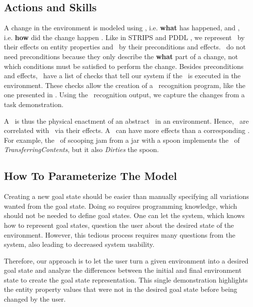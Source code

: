 \subsection{Actions and Skills}\label{ssec:actions_skills}
A change in the environment is modeled using \actions, i.e. \textbf{what} has happened, and \skills, i.e. \textbf{how} did the change happen \cite{conceptHierarchyGeriatronicsSummit24}. Like in STRIPS \cite{strips} and PDDL \cite{pddl}, we represent \actions\ by their effects on entity properties and \skills\ by their preconditions and effects. \actions\ do not need preconditions because they only describe the \textbf{what} part of a change, not which conditions must be satisfied to perform the change. Besides preconditions and effects, \skills\ have a list of checks that tell our system if the \skill\ is executed in the environment. These checks allow the creation of a \skill\ recognition program, like the one presented in \cite{conceptHierarchyGeriatronicsSummit24}.
Using the \skill\ recognition output, we capture the changes from a task demonstration.

A \skill\ is thus the physical enactment of an abstract \action\ in an environment. Hence, \skills\ are correlated with \actions\ via their effects. A \skill\ can have more effects than a corresponding \action. For example, the \skill\ of scooping jam from a jar with a spoon implements the \action\ of \textit{TransferringContents}, but it also \textit{Dirties} the spoon.

\subsection{How To Parameterize The Model}\label{ssec:exp_model_def}
Creating a new goal state should be easier than manually specifying all variations wanted from the goal state. Doing so requires programming knowledge, which should not be needed to define goal states. One can let the system, which knows how to represent goal states, question the user about the desired state of the environment. However, this tedious process requires many questions from the system, also leading to decreased system usability.

Therefore, our approach is to let the user turn a given environment into a desired goal state and analyze the differences between the initial and final environment state to create the goal state representation. This single demonstration highlights the entity property values that were not in the desired goal state before being changed by the user.

